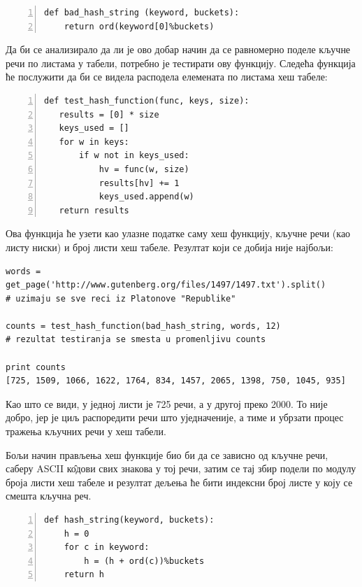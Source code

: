 \begin{lstlisting}[caption = "Лоша" хеш функција, label = {lst:badhash}, numbers = left]
def bad_hash_string (keyword, buckets):
    return ord(keyword[0]%buckets)
\end{lstlisting}

Да би се анализирало да ли је ово добар начин да се равномерно поделе кључне речи по листама у табели, потребно је тестирати ову функцију. Следећа функција ће послужити да би се видела расподела елемената по листама хеш табеле:

\begin{lstlisting}[caption = Тестирање хеш функције, label={lst:hashtest}, numbers=left]
def test_hash_function(func, keys, size):
   results = [0] * size
   keys_used = []
   for w in keys:
       if w not in keys_used:
           hv = func(w, size)
           results[hv] += 1
           keys_used.append(w)
   return results
\end{lstlisting}

Ова функција ће узети као улазне податке саму хеш функцију, кључне речи (као листу ниски) и број листи хеш табеле. Резултат који се добија није најбољи:

\begin{lstlisting}[caption = Резултат тестирања лоше hash функције, label={lst:resultstest}]
words = get_page('http://www.gutenberg.org/files/1497/1497.txt').split()
# uzimaju se sve reci iz Platonove "Republike"

counts = test_hash_function(bad_hash_string, words, 12)
# rezultat testiranja se smesta u promenljivu counts

print counts
[725, 1509, 1066, 1622, 1764, 834, 1457, 2065, 1398, 750, 1045, 935]
\end{lstlisting}

Као што се види, у једној листи је 725 речи, а у другој преко 2000. То није добро, јер је циљ распоредити речи што уједначеније, а тиме и убрзати процес тражења кључних речи у хеш табели.

Бољи начин прављења хеш функције био би да се зависно од кључне речи, саберу ASCII к\^{о}дови свих знакова у тој речи, затим се тај збир подели по модулу броја листи хеш табеле и резултат дељења ће бити индексни број листе у коју се смешта кључна реч.

\begin{lstlisting}[caption=Боља хеш функција, label={lst:betterhash}, numbers = left]
def hash_string(keyword, buckets):
    h = 0
    for c in keyword:
        h = (h + ord(c))%buckets
    return h
\end{lstlisting}

